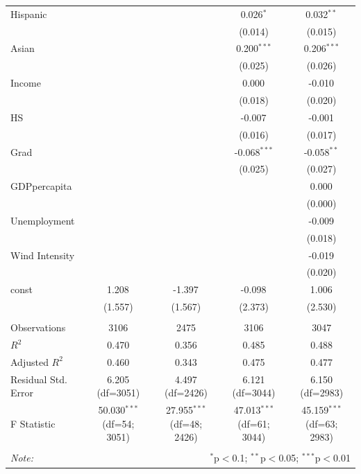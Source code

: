 \begin{table}[!htbp]
\begin{tabular}{@{\extracolsep{5pt}}lcccc}
 Hispanic & & & 0.026$^{*}$ & 0.032$^{**}$ \\
& & & (0.014) & (0.015) \\
 Asian & & & 0.200$^{***}$ & 0.206$^{***}$ \\
& & & (0.025) & (0.026) \\
 Income & & & 0.000$^{}$ & -0.010$^{}$ \\
& & & (0.018) & (0.020) \\
 HS & & & -0.007$^{}$ & -0.001$^{}$ \\
& & & (0.016) & (0.017) \\
 Grad & & & -0.068$^{***}$ & -0.058$^{**}$ \\
& & & (0.025) & (0.027) \\
 GDPpercapita & & & & 0.000$^{}$ \\
& & & & (0.000) \\
 Unemployment & & & & -0.009$^{}$ \\
& & & & (0.018) \\
 Wind Intensity & & & & -0.019$^{}$ \\
& & & & (0.020) \\
 const & 1.208$^{}$ & -1.397$^{}$ & -0.098$^{}$ & 1.006$^{}$ \\
& (1.557) & (1.567) & (2.373) & (2.530) \\
\hline \\[-1.8ex]
 Observations & 3106 & 2475 & 3106 & 3047 \\
 $R^2$ & 0.470 & 0.356 & 0.485 & 0.488 \\
 Adjusted $R^2$ & 0.460 & 0.343 & 0.475 & 0.477 \\
 Residual Std. Error & 6.205 (df=3051) & 4.497 (df=2426) & 6.121 (df=3044) & 6.150 (df=2983) \\
 F Statistic & 50.030$^{***}$ (df=54; 3051) & 27.955$^{***}$ (df=48; 2426) & 47.013$^{***}$ (df=61; 3044) & 45.159$^{***}$ (df=63; 2983) \\
\hline
\hline \\[-1.8ex]
\textit{Note:} & \multicolumn{4}{r}{$^{*}$p$<$0.1; $^{**}$p$<$0.05; $^{***}$p$<$0.01} \\
\end{tabular}
\end{table}